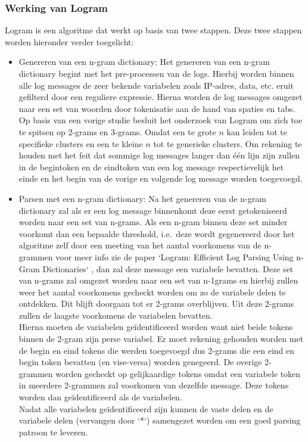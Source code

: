 \subsubsection{Werking van Logram}
Logram is een algoritme dat werkt op basis  van twee stappen. Deze twee stappen worden hieronder verder toegelicht:
\begin{itemize}
    \item Genereren van een n-gram dictionary: Het genereren van een n-gram dictionary begint met het pre-processen van de logs. Hierbij worden binnen alle log messages de zeer bekende variabelen zoals IP-adres, data, etc. eruit gefilterd door een reguliere expressie. Hierna worden de log messages omgezet naar een set van woorden door tokenisatie aan de hand van spaties en tabs. Op basis van een vorige studie besluit het onderzoek van Logram om zich toe te spitsen op 2-grams en 3-grams. Omdat een te grote $n$ kan leiden tot te specifieke clusters en een te kleine $n$ tot te generieke clusters. Om rekening te houden met het feit dat sommige log messages langer dan één lijn zijn zullen in de begintoken en de eindtoken van een log message respectievelijk het einde en het begin van de vorige en volgende log message worden toegevoegd.\\
    
    \item Parsen met een n-gram dictionary: Na het genereren van de n-gram dictionary zal als er een log message binnenkomt deze eerst getokeniseerd worden naar een set van n-grams. Als een n-gram binnen deze set minder voorkomt dan een bepaalde threshold, i.e.\ deze wordt gegenereerd door het algoritme zelf door een meeting van het aantal voorkomens van de n-grammen voor meer info zie de paper `Logram: Efficient Log Parsing Using n-Gram Dictionaries` \autocite{dai2020logram}, dan zal deze message een variabele bevatten. Deze set van n-grams zal omgezet worden naar een set van n-1grams en hierbij zullen weer het aantal voorkomens gecheckt worden om zo de variabele delen te ontdekken. Dit blijft doorgaan tot er 2-grams overblijven. Uit deze 2-grams zullen de laagste voorkomens de variabelen bevatten.\\ 
    
    Hierna moeten de variabelen geïdentificeerd worden want niet beide tokens binnen de 2-gram zijn perse variabel. Er moet rekening gehouden worden met de begin en eind tokens die werden toegevoegd dus 2-grams die een eind en begin token bevatten (en vise-versa) worden genegeerd. De overige 2-grammen worden gecheckt op gelijkaardige tokens omdat een variabele token in meerdere 2-grammen zal voorkomen van dezelfde message. Deze tokens worden dan geïdentificeerd als de variabelen.\\
    
    Nadat alle variabelen geïdentificeerd zijn kunnen de vaste delen en de variabele delen (vervangen door `*`) samengezet worden om een goed parsing patroon te leveren.
\end{itemize}

